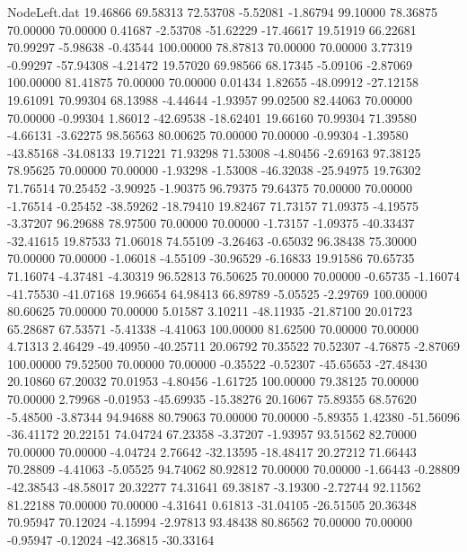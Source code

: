 \begin{filecontents}{NodeLeft.dat}
  19.46866   69.58313   72.53708    -5.52081   -1.86794   99.10000   78.36875   70.00000   70.00000    0.41687   -2.53708  -51.62229  -17.46617
  19.51919   66.22681   70.99297    -5.98638   -0.43544  100.00000   78.87813   70.00000   70.00000    3.77319   -0.99297  -57.94308   -4.21472
  19.57020   69.98566   68.17345    -5.09106   -2.87069  100.00000   81.41875   70.00000   70.00000    0.01434    1.82655  -48.09912  -27.12158
  19.61091   70.99304   68.13988    -4.44644   -1.93957   99.02500   82.44063   70.00000   70.00000   -0.99304    1.86012  -42.69538  -18.62401
  19.66160   70.99304   71.39580    -4.66131   -3.62275   98.56563   80.00625   70.00000   70.00000   -0.99304   -1.39580  -43.85168  -34.08133
  19.71221   71.93298   71.53008    -4.80456   -2.69163   97.38125   78.95625   70.00000   70.00000   -1.93298   -1.53008  -46.32038  -25.94975
  19.76302   71.76514   70.25452    -3.90925   -1.90375   96.79375   79.64375   70.00000   70.00000   -1.76514   -0.25452  -38.59262  -18.79410
  19.82467   71.73157   71.09375    -4.19575   -3.37207   96.29688   78.97500   70.00000   70.00000   -1.73157   -1.09375  -40.33437  -32.41615
  19.87533   71.06018   74.55109    -3.26463   -0.65032   96.38438   75.30000   70.00000   70.00000   -1.06018   -4.55109  -30.96529   -6.16833
  19.91586   70.65735   71.16074    -4.37481   -4.30319   96.52813   76.50625   70.00000   70.00000   -0.65735   -1.16074  -41.75530  -41.07168
  19.96654   64.98413   66.89789    -5.05525   -2.29769  100.00000   80.60625   70.00000   70.00000    5.01587    3.10211  -48.11935  -21.87100
  20.01723   65.28687   67.53571    -5.41338   -4.41063  100.00000   81.62500   70.00000   70.00000    4.71313    2.46429  -49.40950  -40.25711
  20.06792   70.35522   70.52307    -4.76875   -2.87069  100.00000   79.52500   70.00000   70.00000   -0.35522   -0.52307  -45.65653  -27.48430
  20.10860   67.20032   70.01953    -4.80456   -1.61725  100.00000   79.38125   70.00000   70.00000    2.79968   -0.01953  -45.69935  -15.38276
  20.16067   75.89355   68.57620    -5.48500   -3.87344   94.94688   80.79063   70.00000   70.00000   -5.89355    1.42380  -51.56096  -36.41172
  20.22151   74.04724   67.23358    -3.37207   -1.93957   93.51562   82.70000   70.00000   70.00000   -4.04724    2.76642  -32.13595  -18.48417
  20.27212   71.66443   70.28809    -4.41063   -5.05525   94.74062   80.92812   70.00000   70.00000   -1.66443   -0.28809  -42.38543  -48.58017
  20.32277   74.31641   69.38187    -3.19300   -2.72744   92.11562   81.22188   70.00000   70.00000   -4.31641    0.61813  -31.04105  -26.51505
  20.36348   70.95947   70.12024    -4.15994   -2.97813   93.48438   80.86562   70.00000   70.00000   -0.95947   -0.12024  -42.36815  -30.33164

\end{filecontents}
